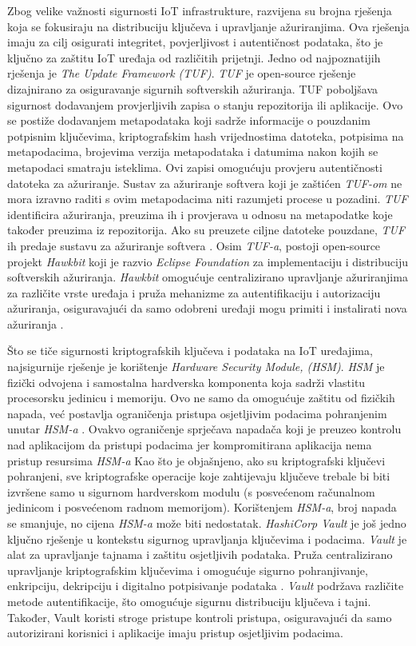 \documentclass[zavrsnirad]{fer}
\begin{document}
	Zbog velike važnosti sigurnosti IoT infrastrukture, razvijena su brojna rješenja koja se fokusiraju na distribuciju ključeva i upravljanje ažuriranjima. Ova rješenja imaju za cilj osigurati integritet, povjerljivost i autentičnost podataka, što je ključno za zaštitu IoT uređaja od različitih prijetnji. 
	Jedno od najpoznatijih rješenja je \textit{The Update Framework (TUF)}. \textit{TUF} je open-source rješenje dizajnirano za osiguravanje sigurnih softverskih ažuriranja. TUF poboljšava sigurnost dodavanjem provjerljivih zapisa o stanju repozitorija ili aplikacije. Ovo se postiže dodavanjem metapodataka koji sadrže informacije o pouzdanim potpisnim ključevima, kriptografskim hash vrijednostima datoteka, potpisima na metapodacima, brojevima verzija metapodataka i datumima nakon kojih se metapodaci smatraju isteklima. Ovi zapisi omogućuju provjeru autentičnosti datoteka za ažuriranje. Sustav za ažuriranje softvera koji je zaštićen \textit{TUF-om} ne mora izravno raditi s ovim metapodacima niti razumjeti procese u pozadini. \textit{TUF} identificira ažuriranja, preuzima ih i provjerava u odnosu na metapodatke koje također preuzima iz repozitorija. Ako su preuzete ciljne datoteke pouzdane, \textit{TUF} ih predaje sustavu za ažuriranje softvera \cite{tuf2024}. Osim \textit{TUF-a}, postoji open-source projekt \textit{Hawkbit} koji je razvio \textit{Eclipse Foundation} za implementaciju i distribuciju softverskih ažuriranja. \textit{Hawkbit} omogućuje centralizirano upravljanje ažuriranjima za različite vrste uređaja i pruža mehanizme za autentifikaciju i autorizaciju ažuriranja, osiguravajući da samo odobreni uređaji mogu primiti i instalirati nova ažuriranja \cite{hawkbit}.
	
	Što se tiče sigurnosti kriptografskih ključeva i podataka na IoT uređajima, najsigurnije rješenje je korištenje \textit{Hardware Security Module, (HSM)}. \textit{HSM} je fizički odvojena i samostalna hardverska komponenta koja sadrži vlastitu procesorsku jedinicu i memoriju. Ovo ne samo da omogućuje zaštitu od fizičkih napada, već postavlja ograničenja pristupa osjetljivim podacima pohranjenim unutar \textit{HSM-a} \cite{thalesdocs}. Ovakvo ograničenje sprječava napadača koji je preuzeo kontrolu nad aplikacijom da pristupi podacima jer kompromitirana aplikacija nema pristup resursima \textit{HSM-a} Kao što je objašnjeno, ako su kriptografski ključevi pohranjeni, sve kriptografske operacije koje zahtijevaju ključeve trebale bi biti izvršene samo u sigurnom hardverskom modulu (s posvećenom računalnom jedinicom i posvećenom radnom memorijom). Korištenjem \textit{HSM-a}, broj napada se smanjuje, no cijena \textit{HSM-a} može biti nedostatak. \textit{HashiCorp Vault} je još jedno ključno rješenje u kontekstu sigurnog upravljanja ključevima i podacima. \textit{Vault} je alat za upravljanje tajnama i zaštitu osjetljivih podataka. Pruža centralizirano upravljanje kriptografskim ključevima i omogućuje sigurno pohranjivanje, enkripciju, dekripciju i digitalno potpisivanje podataka \cite{hashicorp_vault}. \textit{Vault} podržava različite metode autentifikacije, što omogućuje sigurnu distribuciju ključeva i tajni. Također, Vault koristi stroge pristupe kontroli pristupa, osiguravajući da samo autorizirani korisnici i aplikacije imaju pristup osjetljivim podacima.
	
\end{document}
